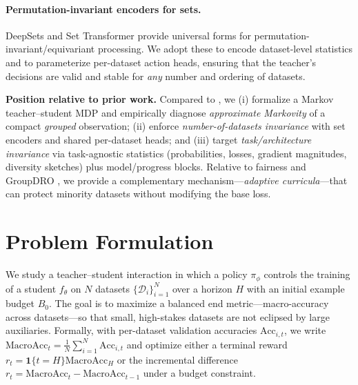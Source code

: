 \documentclass[11pt]{article}
\newcommand{\MacroAcc}{\mathrm{MacroAcc}}
\newcommand{\1}{\mathbf{1}}
\begin{document}
\paragraph{Permutation-invariant encoders for sets.}
DeepSets \citep{zaheer2017deepsets} and Set Transformer \citep{lee2019settransformer} provide universal forms for permutation-invariant/equivariant processing. We adopt these to encode dataset-level statistics and to parameterize per-dataset action heads, ensuring that the teacher’s decisions are valid and stable for \emph{any} number and ordering of datasets.

\medskip
\noindent\textbf{Position relative to prior work.}
Compared to \citet{fan2018l2t,wu2018l2tloss}, we (i) formalize a Markov teacher--student MDP and empirically diagnose \emph{approximate Markovity} of a compact \emph{grouped} observation; (ii) enforce \emph{number-of-datasets invariance} with set encoders and shared per-dataset heads; and (iii) target \emph{task/architecture invariance} via task-agnostic statistics (probabilities, losses, gradient magnitudes, diversity sketches) plus model/progress blocks. Relative to fairness and GroupDRO \citep{hashimoto2018fairness,sagawa2020dro}, we provide a complementary mechanism—\emph{adaptive curricula}—that can protect minority datasets without modifying the base loss.

\section{Problem Formulation}
We study a teacher--student interaction in which a policy $\pi_\phi$ controls the training of a student $f_\theta$ on $N$ datasets $\{\mathcal{D}_i\}_{i=1}^N$ over a horizon $H$ with an initial example budget $B_0$. The goal is to maximize a balanced end metric---macro-accuracy across datasets---so that small, high-stakes datasets are not eclipsed by large auxiliaries. Formally, with per-dataset validation accuracies $\mathrm{Acc}_{i,t}$, we write $\MacroAcc_t=\frac{1}{N}\sum_{i=1}^N \mathrm{Acc}_{i,t}$ and optimize either a terminal reward $r_t=\1\{t=H\}\MacroAcc_H$ or the incremental difference $r_t=\MacroAcc_t-\MacroAcc_{t-1}$ under a budget constraint.
\end{document}
